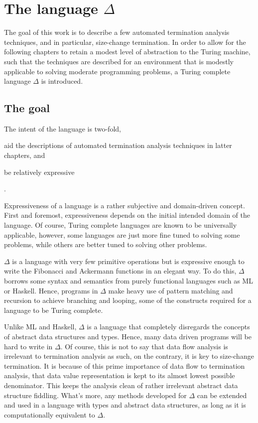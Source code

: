 \newcommand{\D}{$\Delta$}
\chapter{The language \D{}}\label{section:d}

The goal of this work is to describe a few automated termination analysis
techniques, and in particular, size-change termination. In order to allow for
the following chapters to retain a modest level of abstraction to the Turing
machine, such that the techniques are described for an environment that is
modestly applicable to solving moderate programming problems, a Turing complete
language \D{} is introduced.

\section{The goal}

The intent of the language is two-fold, \begin{inparaenum}[(1)]\item aid the
descriptions of automated termination analysis techniques in latter
chapters, and \item be relatively expressive\end{inparaenum}.

Expressiveness of a language is a rather subjective and domain-driven concept.
First and foremost, expressiveness depends on the initial intended domain of
the language. Of course, Turing complete languages are known to be universally
applicable, however, some languages are just more fine tuned to solving some
problems, while others are better tuned to solving other problems.

\D{} is a language with very few primitive operations but is expressive enough
to write the Fibonacci and Ackermann functions in an elegant way. To do this,
\D{} borrows some syntax and semantics from purely functional languages such as
ML or Haskell. Hence, programs in \D{} make heavy use of pattern matching and
recursion to achieve branching and looping, some of the constructs required for
a language to be Turing complete.

Unlike ML and Haskell, \D{} is a language that completely disregards the
concepts of abstract data structures and types. Hence, many data driven
programs will be hard to write in \D{}. Of course, this is not to say that data
flow analysis is irrelevant to termination analysis as such, on the contrary,
it is key to size-change termination. It is because of this prime importance of
data flow to termination analysis, that data value representation is kept to
its almost lowest possible denominator. This keeps the analysis clean of rather
irrelevant abstract data structure fiddling. What's more, any methods developed
for \D{} can be extended and used in a language with types and abstract data
structures, as long as it is computationally equivalent to \D{}.

